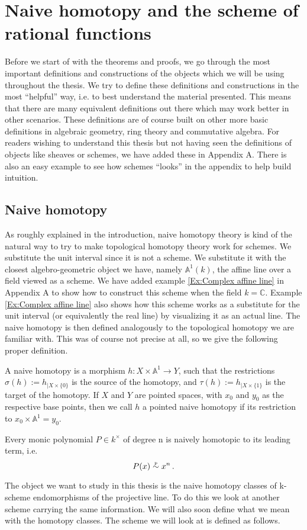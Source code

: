 \chapter{Naive homotopy and the scheme of rational functions}
%
Before we start of with the theorems and proofs, we go through the most important definitions and constructions of the objects which we will be using throughout the thesis. We try to define these definitions and constructions in the most ``helpful'' way, i.e. to best understand the material presented. This means that there are many equivalent definitions out there which may work better in other scenarios. These definitions are of course built on other more basic definitions in algebraic geometry, ring theory and commutative algebra. For readers wishing to understand this thesis but not having seen the definitions of objects like sheaves or schemes, we have added these in Appendix A. There is also an easy example to see how schemes ``looks'' in the appendix to help build intuition.
%
%
\section{Naive homotopy}
%
As roughly explained in the introduction, naive homotopy theory is kind of the natural way to try to make topological homotopy theory work for schemes. We substitute the unit interval since it is not a scheme. 
We substitute it with the closest algebro-geometric object we have, namely \(\mathbb{A}^1(k)\), the affine line over a field viewed as a scheme. We have added example \ref{Ex:Complex affine line} in Appendix A to show how to construct this scheme when the field \(k=\mathbb{C}\). 
Example \ref{Ex:Complex affine line} also shows how this scheme works as a substitute for the unit interval (or equivalently the real line) by visualizing it as an actual line. The naive homotopy is then defined analogously to the topological homotopy we are familiar with. This was of course not precise at all, so we give the following proper definition.
%
\begin{definition}\label{Def:Naive Homotopy}
%
A naive homotopy is a morphism \(h: X \times \mathbb{A}^1 \longrightarrow Y\), such that the restrictions \(\sigma (h) := h_{|X\times \{0\}}\) is the source of the homotopy, and \(\tau (h) := h_{|X\times \{1\}}\) is the target of the homotopy. If \(X\) and \(Y\) are pointed spaces, with \(x_0\) and \(y_0\) as the respective base points, then we call \(h\) a pointed naive homotopy if its restriction to \(x_0 \times \mathbb{A}^1 = y_0\).
%
\begin{example}
%
Every monic polynomial \(P\in k^{\times}\) of degree n is naively homotopic to its leading term, i.e.
\begin{equation*}
    P(x) \htpy x^n \,.
\end{equation*}
%
\end{example}
%
\end{definition}
%
The object we want to study in this thesis is the naive homotopy classes of k-scheme endomorphisms of the projective line. To do this we look at another scheme carrying the same information. We will also soon define what we mean with the homotopy classes. The scheme we will look at is defined as follows.
%
%
